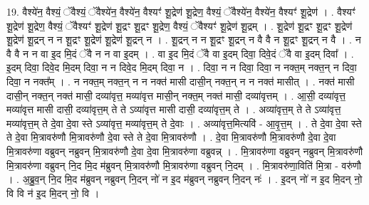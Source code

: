 \documentclass[17pt]{extarticle}
\begin{document}
19. वैश्ये॑न॒ वैश्यं॒ ॅवैश्यं॒ ॅवैश्ये॑न॒ वैश्ये॑न॒ वैश्यꣳ॑ शू॒द्रेण॑ शू॒द्रेण॒ वैश्यं॒ ॅवैश्ये॑न॒ वैश्ये॑न॒ वैश्यꣳ॑ शू॒द्रेण॑ । . वैश्यꣳ॑ शू॒द्रेण॑ शू॒द्रेण॒ वैश्यं॒ ॅवैश्यꣳ॑ शू॒द्रेण॑ शू॒द्रꣳ शू॒द्रꣳ शू॒द्रेण॒ वैश्यं॒ ॅवैश्यꣳ॑ शू॒द्रेण॑ शू॒द्रम् । . शू॒द्रेण॑ शू॒द्रꣳ शू॒द्रꣳ शू॒द्रेण॑ शू॒द्रेण॑ शू॒द्रन् न न शू॒द्रꣳ शू॒द्रेण॑ शू॒द्रेण॑ शू॒द्रन् न । . शू॒द्रन् न न शू॒द्रꣳ शू॒द्रन् न वै वै न शू॒द्रꣳ शू॒द्रन् न वै । . न वै वै न न वा इ॒द मि॒दं ॅवै न न वा इ॒दम् । . वा इ॒द मि॒दं ॅवै वा इ॒दम् दिवा॒ दिवे॒दं ॅवै वा इ॒दम् दिवा᳚ । . इ॒दम् दिवा॒ दिवे॒द मि॒दम् दिवा॒ न न दिवे॒द मि॒दम् दिवा॒ न । . दिवा॒ न न दिवा॒ दिवा॒ न नक्त॒म् नक्त॒न् न दिवा॒ दिवा॒ न नक्त᳚म् । . न नक्त॒म् नक्त॒न् न न नक्त॑ मासी दासी॒न् नक्त॒न् न न नक्त॑ मासीत् । . नक्त॑ मासी दासी॒न् नक्त॒न् नक्त॑ मासी॒ दव्या॑वृत्त॒ मव्या॑वृत्त मासी॒न् नक्त॒म् नक्त॑ मासी॒ दव्या॑वृत्तम् । . आ॒सी॒ दव्या॑वृत्त॒ मव्या॑वृत्त मासी दासी॒ दव्या॑वृत्त॒म् ते ते ऽव्या॑वृत्त मासी दासी॒ दव्या॑वृत्त॒म् ते । . अव्या॑वृत्त॒म् ते ते ऽव्या॑वृत्त॒ मव्या॑वृत्त॒म् ते दे॒वा दे॒वा स्ते ऽव्या॑वृत्त॒ मव्या॑वृत्त॒म् ते दे॒वाः । . अव्या॑वृत्त॒मित्यवि॑ - आ॒वृ॒त्त॒म् । . ते दे॒वा दे॒वा स्ते ते दे॒वा मि॒त्रावरु॑णौ मि॒त्रावरु॑णौ दे॒वा स्ते ते दे॒वा मि॒त्रावरु॑णौ । . दे॒वा मि॒त्रावरु॑णौ मि॒त्रावरु॑णौ दे॒वा दे॒वा मि॒त्रावरु॑णा वब्रुवन् नब्रुवन् मि॒त्रावरु॑णौ दे॒वा दे॒वा मि॒त्रावरु॑णा वब्रुवन्न् । . मि॒त्रावरु॑णा वब्रुवन् नब्रुवन् मि॒त्रावरु॑णौ मि॒त्रावरु॑णा वब्रुवन् नि॒द मि॒द म॑ब्रुवन् मि॒त्रावरु॑णौ मि॒त्रावरु॑णा वब्रुवन् नि॒दम् । . मि॒त्रावरु॑णा॒विति॑ मि॒त्रा - वरु॑णौ । . अ॒ब्रु॒व॒न् नि॒द मि॒द म॑ब्रुवन् नब्रुवन् नि॒दन् नो॑ न इ॒द म॑ब्रुवन् नब्रुवन् नि॒दन् नः॑ । . इ॒दन् नो॑ न इ॒द मि॒दन् नो॒ वि वि न॑ इ॒द मि॒दन् नो॒ वि । \newline
\end{document}
